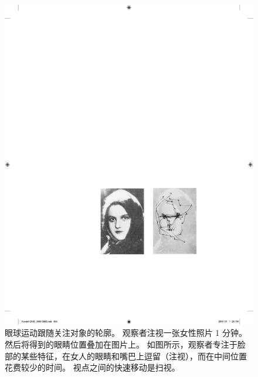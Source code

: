 \begin{figure}[htbp]
	\centering
	\includegraphics[width=0.5\linewidth]{chap35/fig_35_5}
	\caption{眼球运动跟随关注对象的轮廓。
		观察者注视一张女性照片 1 分钟。
		然后将得到的眼睛位置叠加在图片上。
		如图所示，观察者专注于脸部的某些特征，在女人的眼睛和嘴巴上逗留（注视），而在中间位置花费较少的时间。 
		视点之间的快速移动是扫视\cite{yarbus2013eye}。}
	\label{fig:35_5}
\end{figure}


